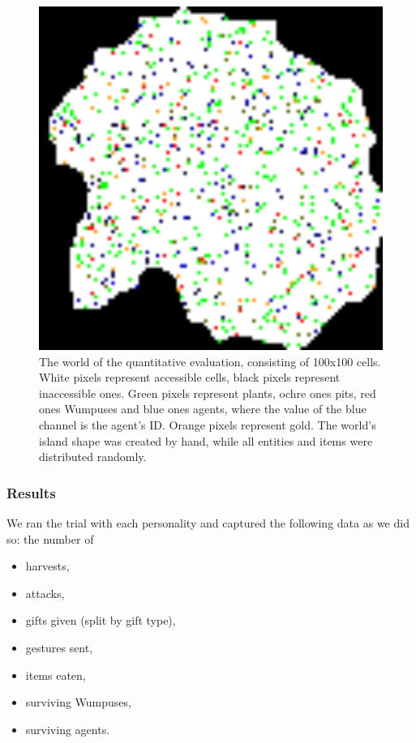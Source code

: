 \begin{figure}
	\centering
	\includegraphics[width=400pt]{Figs/evalWorldQuant.png}
	\caption{The world of the quantitative evaluation, consisting of 100x100 cells. White pixels represent accessible cells, black pixels represent inaccessible ones. Green pixels represent plants, ochre ones pits, red ones Wumpuses and blue ones agents, where the value of the blue channel is the agent's ID. Orange pixels represent gold. The world's island shape was created by hand, while all entities and items were distributed randomly.}
	\label{fig:evalWorldQuant}
\end{figure}

\subsubsection{Results}

We ran the trial with each personality and captured the following data as we did so: the number of

\begin{itemize}
	\item harvests,
	\item attacks,
	\item gifts given (split by gift type),
	\item gestures sent,
	\item items eaten,
	\item surviving Wumpuses,
	\item surviving agents.
\end{itemize}

